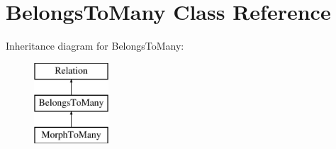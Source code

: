 \section{Belongs\+To\+Many Class Reference}
\label{class_illuminate_1_1_database_1_1_eloquent_1_1_relations_1_1_belongs_to_many}
Inheritance diagram for Belongs\+To\+Many\+:\begin{figure}[H]
\begin{center}
\leavevmode
\includegraphics[height=3.000000cm]{class_illuminate_1_1_database_1_1_eloquent_1_1_relations_1_1_belongs_to_many}
\end{center}
\end{figure}
